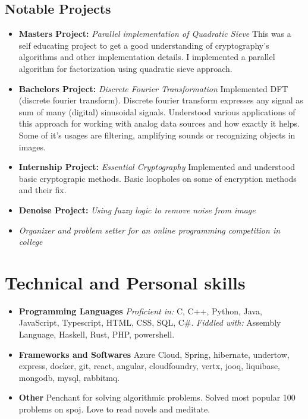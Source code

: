 \documentclass[11pt,a4paper,sans]{moderncv}
\begin{document}
\subsection{Notable Projects}
\vspace{5pt}
\begin{itemize}
  \item
    \textbf{Masters Project:}
    \textit{Parallel implementation of Quadratic Sieve}
    \vspace{2pt}
    \small
    This was a self educating project to get a good understanding of cryptography's algorithms and other implementation details. I implemented a parallel algorithm for factorization using quadratic sieve approach.
    \vspace{5pt}
  \item
    \textbf{Bachelors Project:}
    \textit{Discrete Fourier Transformation}
    \vspace{2pt}
    \small
    Implemented DFT (discrete fourier transform). Discrete fourier transform expresses any signal as sum of many (digital) sinusoidal signals. Understood various applications of this approach for working with analog data sources and how exactly it helps. Some of it's usages are filtering, amplifying sounds or recognizing objects in images.
    \vspace{5pt}
  \item
    \textbf{Internship Project:}
    \textit{Essential Cryptography}
    \vspace{2pt}
    \small
    Implemented and understood basic cryptograpic methods. Basic loopholes on some of encryption methods and their fix.
    \vspace{5pt}
  \item
    \textbf{Denoise Project:}
    \textit{Using fuzzy logic to remove noise from image}
    \vspace{5pt}
  \item
    \textit{Organizer and problem setter for an online programming competition in college}
\end{itemize}
\section{Technical and Personal skills}
\vspace{6pt}
\begin{itemize}
  \item
    \textbf{Programming Languages}
    \textit{Proficient in:}
    C, C++, Python, Java, JavaScript, Typescript, HTML, CSS, SQL, C\#.
    \textit{Fiddled with:}
    Assembly Language, Haskell, Rust, PHP, powershell.
    \vspace{6pt}
  \item 
    \textbf{Frameworks and Softwares}
    Azure Cloud, Spring, hibernate, undertow, express, docker, git, react, angular, cloudfoundry, vertx, jooq, liquibase, mongodb, mysql, rabbitmq.
    \vspace{6pt}
  \item
    \textbf{Other}
    Penchant for solving algorithmic problems. Solved most popular 100 problems on spoj. Love to read novels and meditate.
\end{itemize}
\end{document}
